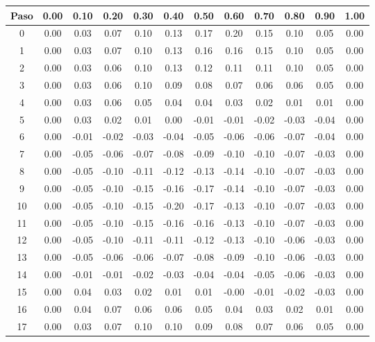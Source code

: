 \documentclass[11pt]{article}
\begin{document}
\begin{table}
\begin{small}
\begin{tabular}{ c c c c c c c c c c c c }
\hline
Paso & 0.00 & 0.10 & 0.20 & 0.30 & 0.40 & 0.50 & 0.60 & 0.70 & 0.80 & 0.90 & 1.00 \\
\hline
\hline
0 & 0.00 & 0.03 & 0.07 & 0.10 & 0.13 & 0.17 & 0.20 & 0.15 & 0.10 & 0.05 & 0.00 \\
1 & 0.00 & 0.03 & 0.07 & 0.10 & 0.13 & 0.16 & 0.16 & 0.15 & 0.10 & 0.05 & 0.00 \\
2 & 0.00 & 0.03 & 0.06 & 0.10 & 0.13 & 0.12 & 0.11 & 0.11 & 0.10 & 0.05 & 0.00 \\
3 & 0.00 & 0.03 & 0.06 & 0.10 & 0.09 & 0.08 & 0.07 & 0.06 & 0.06 & 0.05 & 0.00 \\
4 & 0.00 & 0.03 & 0.06 & 0.05 & 0.04 & 0.04 & 0.03 & 0.02 & 0.01 & 0.01 & 0.00 \\
5 & 0.00 & 0.03 & 0.02 & 0.01 & 0.00 & -0.01 & -0.01 & -0.02 & -0.03 & -0.04 & 0.00 \\
6 & 0.00 & -0.01 & -0.02 & -0.03 & -0.04 & -0.05 & -0.06 & -0.06 & -0.07 & -0.04 & 0.00 \\
7 & 0.00 & -0.05 & -0.06 & -0.07 & -0.08 & -0.09 & -0.10 & -0.10 & -0.07 & -0.03 & 0.00 \\
8 & 0.00 & -0.05 & -0.10 & -0.11 & -0.12 & -0.13 & -0.14 & -0.10 & -0.07 & -0.03 & 0.00 \\
9 & 0.00 & -0.05 & -0.10 & -0.15 & -0.16 & -0.17 & -0.14 & -0.10 & -0.07 & -0.03 & 0.00 \\
10 & 0.00 & -0.05 & -0.10 & -0.15 & -0.20 & -0.17 & -0.13 & -0.10 & -0.07 & -0.03 & 0.00 \\
11 & 0.00 & -0.05 & -0.10 & -0.15 & -0.16 & -0.16 & -0.13 & -0.10 & -0.07 & -0.03 & 0.00 \\
12 & 0.00 & -0.05 & -0.10 & -0.11 & -0.11 & -0.12 & -0.13 & -0.10 & -0.06 & -0.03 & 0.00 \\
13 & 0.00 & -0.05 & -0.06 & -0.06 & -0.07 & -0.08 & -0.09 & -0.10 & -0.06 & -0.03 & 0.00 \\
14 & 0.00 & -0.01 & -0.01 & -0.02 & -0.03 & -0.04 & -0.04 & -0.05 & -0.06 & -0.03 & 0.00 \\
15 & 0.00 & 0.04 & 0.03 & 0.02 & 0.01 & 0.01 & -0.00 & -0.01 & -0.02 & -0.03 & 0.00 \\
16 & 0.00 & 0.04 & 0.07 & 0.06 & 0.06 & 0.05 & 0.04 & 0.03 & 0.02 & 0.01 & 0.00 \\
17 & 0.00 & 0.03 & 0.07 & 0.10 & 0.10 & 0.09 & 0.08 & 0.07 & 0.06 & 0.05 & 0.00 \\

\end{tabular}
\end{small}
\end{table}
\end{document}
